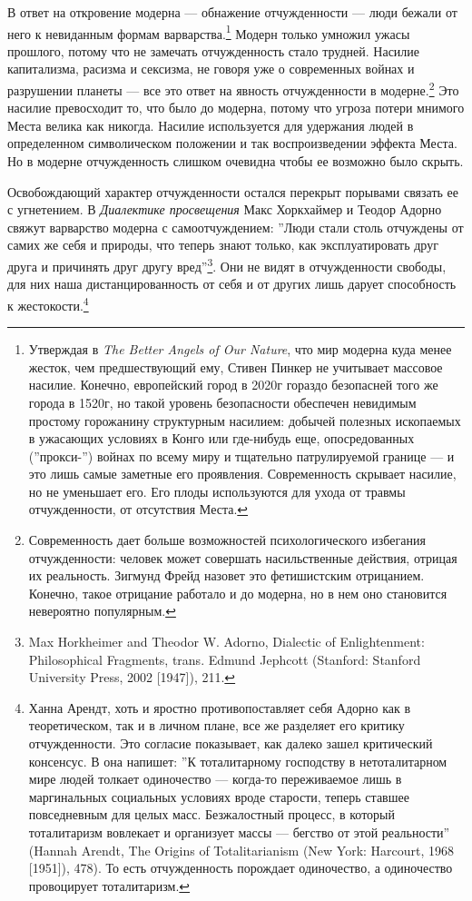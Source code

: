 \documentclass[12pt]{book}
\begin{document}
В ответ на откровение модерна --- обнажение отчужденности --- люди бежали от него к невиданным формам варварства.\footnote{Утверждая в \textit{The Better Angels of Our Nature}, что мир модерна куда менее жесток, чем предшествующий ему, Стивен Пинкер не учитывает массовое насилие. Конечно, европейский город в 2020г гораздо безопасней того же города в 1520г, но такой уровень безопасности обеспечен невидимым простому горожанину структурным насилием: добычей полезных ископаемых в ужасающих условиях в Конго или где-нибудь еще, опосредованных (''прокси-'') войнах по всему миру и тщательно патрулируемой границе --- и это лишь самые заметные его проявления. Современность скрывает насилие, но не уменьшает его. Его плоды используются для ухода от травмы отчужденности, от отсутствия Места.} Модерн только умножил ужасы прошлого, потому что не замечать отчужденность стало трудней. Насилие капитализма, расизма и сексизма, не говоря уже о современных войнах и разрушении планеты --- все это ответ на явность отчужденности в модерне.\footnote{Современность дает больше возможностей психологического избегания отчужденности: человек может совершать насильственные действия, отрицая их реальность. Зигмунд Фрейд назовет это фетишистским отрицанием. Конечно, такое отрицание работало и до модерна, но в нем оно становится невероятно популярным.} Это насилие превосходит то, что было до модерна, потому что угроза потери мнимого Места велика как никогда. Насилие используется для удержания людей в определенном символическом положении и так воспроизведении эффекта Места. Но в модерне отчужденность слишком очевидна чтобы ее возможно было скрыть.

Освобождающий характер отчужденности остался перекрыт порывами связать ее с угнетением. В \textit{Диалектике просвещения} Макс Хоркхаймер и Теодор Адорно свяжут варварство модерна с самоотчуждением: ''Люди стали столь отчуждены от самих же себя и природы, что теперь знают только, как эксплуатировать друг друга и причинять друг другу вред''\footnote{Max Horkheimer and Theodor W. Adorno, Dialectic of Enlightenment: Philosophical Fragments, trans. Edmund Jephcott (Stanford: Stanford University Press, 2002 [1947]), 211.}. Они не видят в отчужденности свободы, для них наша дистанцированность от себя и от других лишь дарует способность к жестокости.\footnote{Ханна Арендт, хоть и яростно противопоставляет себя Адорно как в теоретическом, так и в личном плане, все же разделяет его критику отчужденности. Это согласие показывает, как далеко зашел критический консенсус. В  она напишет: ''К тоталитарному господству в нетоталитарном мире людей толкает одиночество --- когда-то переживаемое лишь в маргинальных социальных условиях вроде старости, теперь ставшее повседневным для целых масс. Безжалостный процесс, в который тоталитаризм вовлекает и организует массы --- бегство от этой реальности'' (Hannah Arendt, The Origins of Totalitarianism (New York: Harcourt, 1968 [1951]), 478). То есть отчужденность порождает одиночество, а одиночество провоцирует тоталитаризм.}
\end{document}
